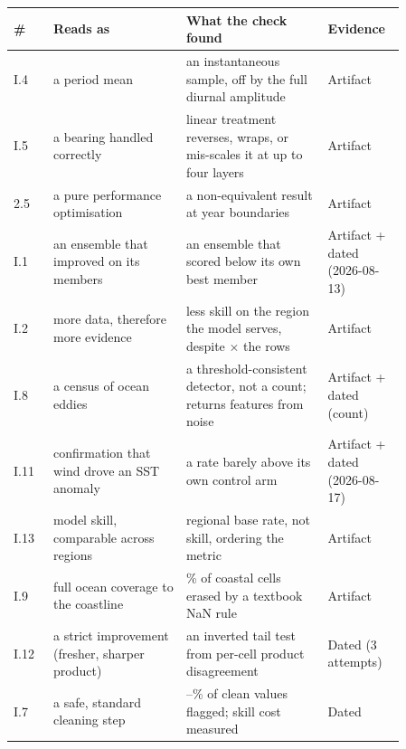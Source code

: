 \begin{wtable}
\centering
\tabscale
\caption{All eleven instances: what the plausible reading obscures, the
check that surfaced it, and this paper's own reproducibility ledger for the
claim (Artifact = every sub-claim traces to a committed report or a
currently-passing test; Artifact + dated = a tested mechanism paired with a
headline number that is a single, named, re-runnable measurement of a
moving state, with no stored output; Dated = no committed artifact at all,
mechanism included).}
\label{tab:instances}
\begin{tabular}{p{0.09\linewidth}p{0.30\linewidth}p{0.32\linewidth}p{0.15\linewidth}}
\toprule
\# & Reads as & What the check found & Evidence \\
\midrule
I.4 & a period mean & an instantaneous sample, off by the full diurnal amplitude & Artifact \\
I.5 & a bearing handled correctly & linear treatment reverses, wraps, or mis-scales it at up to four layers & Artifact \\
2.5 & a pure performance optimisation & a non-equivalent result at year boundaries & Artifact \\
I.1 & an ensemble that improved on its members & an ensemble that scored below its own best member & Artifact + dated (2026-08-13) \\
I.2 & more data, therefore more evidence & less skill on the region the model serves, despite \GvrDataMultiple{}$\times$ the rows & Artifact \\
I.8 & a census of ocean eddies & a threshold-consistent detector, not a count; returns features from noise & Artifact + dated (count) \\
I.11 & confirmation that wind drove an SST anomaly & a rate barely above its own control arm & Artifact + dated (2026-08-17) \\
I.13 & model skill, comparable across regions & regional base rate, not skill, ordering the metric & Artifact \\
I.9 & full ocean coverage to the coastline & \BilinearErasedPct{}\% of coastal cells erased by a textbook NaN rule & Artifact \\
I.12 & a strict improvement (fresher, sharper product) & an inverted tail test from per-cell product disagreement & Dated (3 attempts) \\
I.7 & a safe, standard cleaning step & \HampelFlagLow{}--\HampelFlagHigh{}\% of clean values flagged; skill cost measured & Dated \\
\bottomrule
\end{tabular}
\end{wtable}

